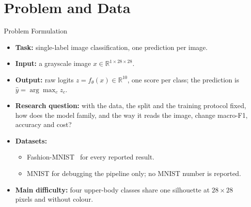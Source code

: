 
\section{Problem and Data}

\begin{frame}{Problem Formulation}
\begin{itemize}
    \item \textbf{Task:} single-label image classification, one prediction per image.
    \item \textbf{Input:} a grayscale image $x \in \mathbb{R}^{1 \times 28 \times 28}$.
    \item \textbf{Output:} raw logits $z = f_\theta(x) \in \mathbb{R}^{10}$, one score per class;
          the prediction is $\hat{y} = \arg\max_c z_c$.
    \item \textbf{Research question:} with the data, the split and the training protocol fixed,
          how does the model family, and the way it reads the image, change macro-F1, accuracy and cost?
    \item \textbf{Datasets:}
    \begin{itemize}
        \item Fashion-MNIST~\cite{xiao2017fashion} for every reported result.
        \item MNIST for debugging the pipeline only; no MNIST number is reported.
    \end{itemize}
    \item \textbf{Main difficulty:} four upper-body classes share one silhouette at
          $28 \times 28$ pixels and without colour.
\end{itemize}
\end{frame}

